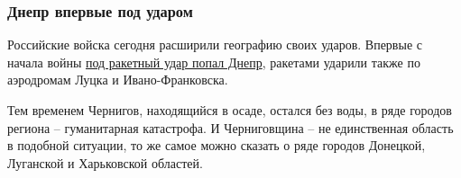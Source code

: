  
 
 
 
 

\subsubsection{Днепр впервые под ударом}

Российские войска сегодня расширили географию своих ударов. Впервые с начала
войны \href{https://strana.news/news/381258-udarivshie-po-dnepru-rossijskie-rakety-razrushili-obuvnuju-fabriku-pohib-odin-chelovek.html}{под ракетный удар попал Днепр}, ракетами ударили также по аэродромам Луцка
и Ивано-Франковска.

Тем временем Чернигов, находящийся в осаде, остался без воды, в ряде городов
региона – гуманитарная катастрофа. И Черниговщина – не единственная область в
подобной ситуации, то же самое можно сказать о ряде городов Донецкой, Луганской
и Харьковской областей.
